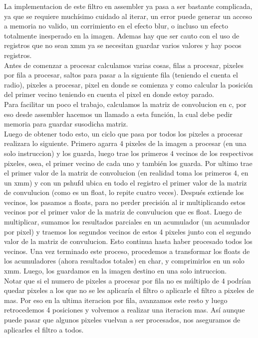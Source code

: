 La implementacion de este filtro en assembler ya pasa a ser bastante complicada, ya que se requiere muchísimo cuidado al iterar, un error puede generar un acceso a memoria no valido, un corrimiento en el efecto blur, o incluso un efecto totalmente inesperado en la imagen. Ademas hay que ser cauto con el uso de registros que no sean xmm ya se necesitan guardar varios valores y hay pocos registros. \\
Antes de comenzar a procesar calculamos varias cosas, filas a procesar, pixeles por fila a procesar, saltos para pasar a la siguiente fila (teniendo el cuenta el radio), pixeles a procesar, pixel en donde se comienza y como calcular la posición del primer vecino teniendo en cuenta el pixel en donde estoy parado. \\
Para facilitar un poco el trabajo, calculamos la matriz de convolucion en c, por eso desde assembler hacemos un llamado a esta función, la cual debe pedir memoria para guardar susodicha matriz. \\
Luego de obtener todo esto, un ciclo que pasa por todos los pixeles a procesar realizara lo siguiente. Primero agarra 4 pixeles de la imagen a procesar (en una solo instruccion) y los guarda, luego trae los primeros 4 vecinos de los respectivos pixeles, osea, el primer vecino de cada uno y también los guarda. Por ultimo trae el primer valor de la matriz de convolucion (en realidad toma los primeros 4, en un xmm) y con un pshufd ubica en todo el registro el primer valor de la matriz de convulucion (como es un float, lo repite cuatro veces). Después extiende los vecinos, los pasamos a floats, para no perder precisión al ir multiplicando estos vecinos por el primer valor de la matriz de convulucion que es float. Luego de multiplicar, sumamos los resultados parciales en un acumulador (un acumulador por pixel) y traemos los segundos vecinos de estos 4 pixeles junto con el segundo valor de la matriz de convulucion. Esto continua hasta haber procesado todos los vecinos. Una vez terminado este proceso, procedemos a transformar los floats de los acumuladores (ahora resultados totales) en char, y comprimirlos en un solo xmm. Luego, los guardamos en la imagen destino en una solo intruccion. \\
Notar que si el numero de pixeles a procesar por fila no es múltiplo de 4 podrían quedar pixeles a los que no se les aplicaría el filtro o aplicarle el filtro a pixeles de mas. Por eso en la ultima iteracion por fila, avanzamos este resto y luego retrocedemos 4 posiciones y volvemos a realizar una iteracion mas. Así aunque puede pasar que algunos pixeles vuelvan a ser procesados, nos aseguramos de aplicarles el filtro a todos. \\
